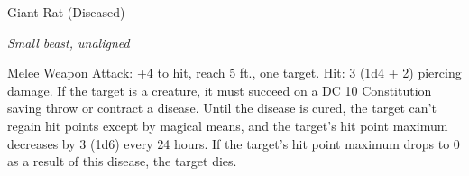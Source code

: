 \begin{monsterbox}{Giant Rat (Diseased)}
\begin{hangingpar}
\textit{Small beast, unaligned}
\end{hangingpar}
\dndline%
\basics[%
armorclass = 12,
hitpoints = 2d6,
speed = {30 ft.}
]
\dndline%
\stats[%
STR = \stat{7},
DEX = \stat{15},
CON = \stat{11},
INT = \stat{2},
WIS = \stat{10},
CHA = \stat{4}
]
\dndline%
\details[%
skills={},
damageimmunities={},
savingthrows={},
conditionimmunities={},
damageresistances={},
damagevulnerabilities={},
senses={darkvision 60 ft., passive Perception 10},
challenge=1/8
]
\dndline%
\begin{monsteraction}[Bite]
Melee Weapon Attack: +4 to hit, reach 5 ft., one target. Hit: 3 (1d4 + 2) piercing damage. If the target is a creature, it must succeed on a DC 10 Constitution saving throw or contract a disease. Until the disease is cured, the target can't regain hit points except by magical means, and the target's hit point maximum decreases by 3 (1d6) every 24 hours. If the target's hit point maximum drops to 0 as a result of this disease, the target dies.
\end{monsteraction}
\end{monsterbox}